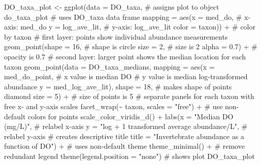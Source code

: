 \documentclass[
  letterpaper,
  DIV=11,
  numbers=noendperiod]{scrartcl}
\newenvironment{Shaded}{\begin{snugshade}}{\end{snugshade}}
\newcommand{\AttributeTok}[1]{\textcolor[rgb]{0.40,0.45,0.13}{#1}}
\newcommand{\CommentTok}[1]{\textcolor[rgb]{0.37,0.37,0.37}{#1}}
\newcommand{\DecValTok}[1]{\textcolor[rgb]{0.68,0.00,0.00}{#1}}
\newcommand{\FloatTok}[1]{\textcolor[rgb]{0.68,0.00,0.00}{#1}}
\newcommand{\FunctionTok}[1]{\textcolor[rgb]{0.28,0.35,0.67}{#1}}
\newcommand{\NormalTok}[1]{\textcolor[rgb]{0.00,0.23,0.31}{#1}}
\newcommand{\OtherTok}[1]{\textcolor[rgb]{0.00,0.23,0.31}{#1}}
\newcommand{\SpecialCharTok}[1]{\textcolor[rgb]{0.37,0.37,0.37}{#1}}
\newcommand{\StringTok}[1]{\textcolor[rgb]{0.13,0.47,0.30}{#1}}
\begin{document}
\begin{Shaded}
\begin{Highlighting}[]
\NormalTok{DO\_taxa\_plot }\OtherTok{\textless{}{-}} \FunctionTok{ggplot}\NormalTok{(}\AttributeTok{data =}\NormalTok{ DO\_taxa, }\CommentTok{\# assigns plot to object do\_taxa\_plot }
                        \CommentTok{\# uses DO\_taxa data frame}
                        \AttributeTok{mapping =} \FunctionTok{aes}\NormalTok{(}\AttributeTok{x =}\NormalTok{ med\_do, }\CommentTok{\# x{-}axis: med\_do}
                                      \AttributeTok{y =}\NormalTok{ log\_ave\_lit, }\CommentTok{\# y{-}axis: log\_ave\_lit}
                                      \AttributeTok{color =}\NormalTok{ taxon)) }\SpecialCharTok{+} \CommentTok{\# color by taxon}
  \CommentTok{\# first layer: points show individual abundance measurements }
  \FunctionTok{geom\_point}\NormalTok{(}\AttributeTok{shape =} \DecValTok{16}\NormalTok{, }\CommentTok{\# shape is circle}
             \AttributeTok{size =} \DecValTok{2}\NormalTok{, }\CommentTok{\# size is 2}
             \AttributeTok{alpha =} \FloatTok{0.7}\NormalTok{) }\SpecialCharTok{+} \CommentTok{\# opacity is 0.7}
  \CommentTok{\# second layer: larger point shows the median location for each taxon}
  \FunctionTok{geom\_point}\NormalTok{(}\AttributeTok{data =}\NormalTok{ DO\_taxa\_medians,}
             \AttributeTok{mapping =} \FunctionTok{aes}\NormalTok{(}\AttributeTok{x =}\NormalTok{ med\_do\_point, }\CommentTok{\# x value is median DO}
                           \CommentTok{\# y value is median log{-}transformed abundance}
                           \AttributeTok{y =}\NormalTok{ med\_log\_ave\_lit),}
             \AttributeTok{shape =} \DecValTok{18}\NormalTok{, }\CommentTok{\# makes shape of points diamond}
             \AttributeTok{size =} \DecValTok{5}\NormalTok{) }\SpecialCharTok{+} \CommentTok{\# size of points is 5}
  \CommentTok{\# separate panels for each taxon with free x{-} and y{-}axis scales}
  \FunctionTok{facet\_wrap}\NormalTok{(}\SpecialCharTok{\textasciitilde{}}\NormalTok{ taxon, }\AttributeTok{scales =} \StringTok{"free"}\NormalTok{) }\SpecialCharTok{+}
  \CommentTok{\# use non{-}default colors for points}
  \FunctionTok{scale\_color\_viridis\_d}\NormalTok{() }\SpecialCharTok{+}
  \FunctionTok{labs}\NormalTok{(}\AttributeTok{x =} \StringTok{"Median DO (mg/L)"}\NormalTok{, }\CommentTok{\# relabel x{-}axis}
       \AttributeTok{y =} \StringTok{"log + 1 transformed average abundance/L"}\NormalTok{, }\CommentTok{\# relabel y{-}axis}
       \CommentTok{\# creates descriptive title}
       \AttributeTok{title =} \StringTok{"Invertebrate abundance as a function of DO"}\NormalTok{) }\SpecialCharTok{+}
  \CommentTok{\# uses non{-}default theme}
  \FunctionTok{theme\_minimal}\NormalTok{() }\SpecialCharTok{+}
  \CommentTok{\# remove redundant legend}
  \FunctionTok{theme}\NormalTok{(}\AttributeTok{legend.position =} \StringTok{"none"}\NormalTok{)}
\CommentTok{\# shows plot}
\NormalTok{DO\_taxa\_plot}
\end{Highlighting}
\end{Shaded}
\end{document}
